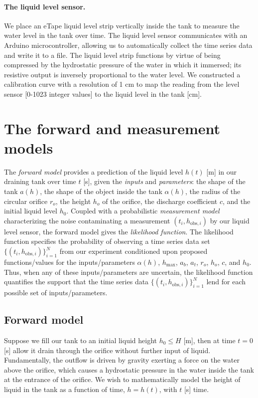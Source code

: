 \documentclass[openacc]{rsproca_new}%
\newcommand\thedata {$\{(t_i,h_{\text{obs}, i})\}_{i=1}^{N}$\xspace}
\begin{document}
\paragraph{The liquid level sensor.} We place an eTape\texttrademark\xspace liquid level strip vertically inside the tank to measure the water level in the tank over time. The liquid level sensor communicates with an Arduino microcontroller, allowing us to automatically collect the time series data and write it to a file. The liquid level strip functions by virtue of being compressed by the hydrostatic pressure of the water in which it immersed; its resistive output is inversely proportional to the water level. 
\cite{eTape}
We constructed a calibration curve with a resolution of 1 cm to map the reading from the level sensor [0-1023 integer values] to the liquid level in the tank [cm]. 

\section{The forward and measurement models}
The \emph{forward model} provides a prediction of the liquid level $h(t)$ [m] in our draining tank over time $t$ [s], given the \emph{inputs} and \emph{parameters}: the shape of the tank $a(h)$, the shape of the object inside the tank $\alpha(h)$, the radius of the circular orifice $r_o$, the height $h_o$ of the orifice, the discharge coefficient $c$, and the initial liquid level $h_0$. 
Coupled with a probabilistic \emph{measurement model} characterizing the noise contaminating a measurement $(t_i, h_{\text{obs}, i})$ by our liquid level sensor, the forward model gives the \emph{likelihood function}. The likelihood function specifies the probability of observing a time series data set \thedata from our experiment conditioned upon proposed functions/values for the inputs/parameters $\alpha(h)$, $h_{\text{max}}$, $a_b$, $a_t$, $r_o$, $h_o$, $c$, and $h_0$. Thus, when any of these inputs/parameters are uncertain, the likelihood function quantifies the support that the time series data \thedata lend for each possible set of inputs/parameters.

\subsection{Forward model}
Suppose we fill our tank to an initial liquid height $h_0 \leq H$ [m], then at time $t=0$ [s] allow it drain through the orifice without further input of liquid. Fundamentally, the outflow is driven by gravity exerting a force on the water above the orifice, which causes a hydrostatic pressure in the water inside the tank at the entrance of the orifice. 
We wish to mathematically model the height of liquid in the tank as a function of time, $h=h(t)$, with $t$ [s] time. 
\end{document}
